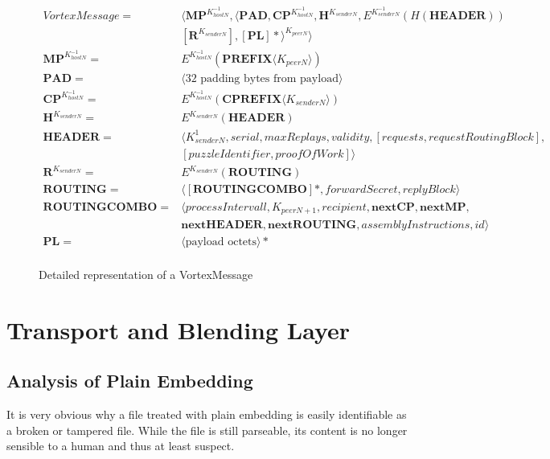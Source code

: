 \begin{figure}[!h]
	\begin{align}
	VortexMessage                = &\langle \mathbf{MP}^{K^{-1}_{hostN}}, \langle\mathbf{PAD}, \mathbf{CP}^{K^{-1}_{hostN}}, \mathbf{H}^{K_{senderN}}, E^{K^{-1}_{senderN}}\left(H\left(\mathbf{HEADER}\right)\right)  \nonumber \\
	& \left[\mathbf{R}^{K_{senderN}}\right], \left[\mathbf{PL}\right]*\rangle^{K_{peerN}} \rangle\label{eq:vortexMessage}\\ 
	\mathbf{MP}^{K^{-1}_{hostN}}  = &E^{K^{-1}_{hostN}}\left(\mathbf{PREFIX}\langle K_{peerN}\rangle \right)\\ 
	\mathbf{PAD}                 = &\langle \text{32 padding bytes from payload} \rangle\\ 
	\mathbf{CP}^{K^{-1}_{hostN}} = &E^{K^{-1}_{hostN}}\left(\mathbf{CPREFIX}\langle K_{senderN}\rangle \right)\\ 
	\mathbf{H}^{K_{senderN}}     = &E^{K_{senderN}}\left(\mathbf{HEADER}\right)\\  
	\mathbf{HEADER}              = &\langle K^{1}_{senderN}, serial, maxReplays, validity, [requests, requestRoutingBlock],\nonumber\\ 
	& [puzzleIdentifier, proofOfWork] \rangle \\  
	\mathbf{R}^{K_{senderN}}     = & E^{K_{senderN}}\left(\mathbf{ROUTING}\right)\\ 
	\mathbf{ROUTING}             = & \langle [ \mathbf{ROUTINGCOMBO} ] *, forwardSecret, replyBlock \rangle\\  
	\mathbf{ROUTINGCOMBO}        = & \langle processIntervall, K_{peerN+1}, recipient, \mathbf{nextCP}, \mathbf{nextMP}, \nonumber \\
	& \mathbf{nextHEADER}, \mathbf{nextROUTING}, assemblyInstructions, id \rangle\\
	\mathbf{PL}                  = &\langle \text{payload octets} \rangle *\\ 
	\end{align}
	\captionsetup{labelformat=empty}
	\caption{Detailed representation of a VortexMessage}
\end{figure}

\section{Transport and Blending Layer}

\subsection{Analysis of Plain Embedding}
It is very obvious why a file treated with plain embedding is easily identifiable as a broken or tampered file. While the file is still parseable, its content is no longer sensible to a human and thus at least suspect. 

